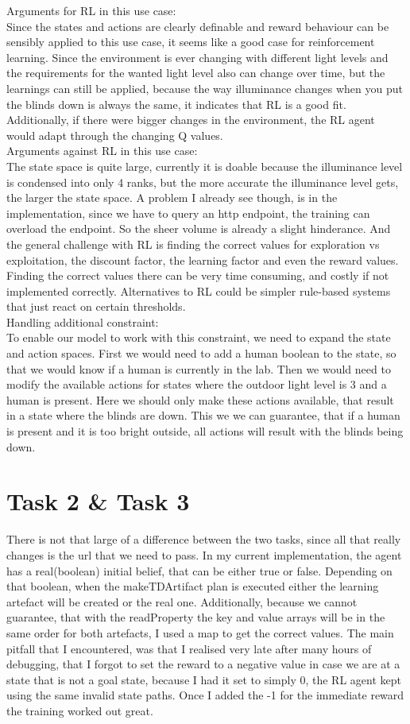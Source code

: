 \documentclass[11pt]{article}
\begin{document}
Arguments for RL in this use case:\\
Since the states and actions are clearly definable and reward behaviour can be sensibly applied to this use case, it seems like a good case for reinforcement learning. Since the environment is ever changing with different light levels and the requirements  for the wanted light level also can change over time, but the learnings can still be applied, because the way illuminance changes when you put the blinds down is always the same, it indicates that RL is a good fit. Additionally, if there were bigger changes in the environment, the RL agent would adapt through the changing Q values. \\
Arguments against RL in this use case:\\
The state space is quite large, currently it is doable because the illuminance level is condensed into only 4 ranks, but the more accurate the illuminance level gets, the larger the state space. A problem I already see though, is in the implementation, since we have to query an http endpoint, the training can overload the endpoint. So the sheer volume is already a slight hinderance. And the general challenge with RL is finding the correct values for exploration vs exploitation, the discount factor, the learning factor and even the reward values. Finding the correct values there can be very time consuming, and costly if not implemented correctly. Alternatives to RL could be simpler rule-based systems that just react on certain thresholds.\\
Handling additional constraint:\\
To enable our model to work with this constraint, we need to expand the state and action spaces. First we would need to add a human boolean to the state, so that we would know if a human is currently in the lab. Then we would need to modify the available actions for states where the outdoor light level is 3 and a human is present. Here we should only make these actions available, that result in a state where the blinds are down. This we we can guarantee, that if a human is present and it is too bright outside, all actions will result with the blinds being down.
\section*{Task 2 \& Task 3}
There is not that large of a difference between the two tasks, since all that really changes is the url that we need to pass. In my current implementation, the agent has a real(boolean) initial belief, that can be either true or false. Depending on that boolean, when the makeTDArtifact plan is executed either the learning artefact will be created or the real one. Additionally, because we cannot guarantee, that with the readProperty the key and value arrays will be in the same order for both artefacts, I used a map to get the correct values. The main pitfall that I encountered, was that I realised very late after many hours of debugging, that I forgot to set the reward to a negative value in case we are at a state that is not a goal state, because I had it set to simply 0, the RL agent kept using the same invalid state paths. Once I added the -1 for the immediate reward the training worked out great. 
\end{document}
